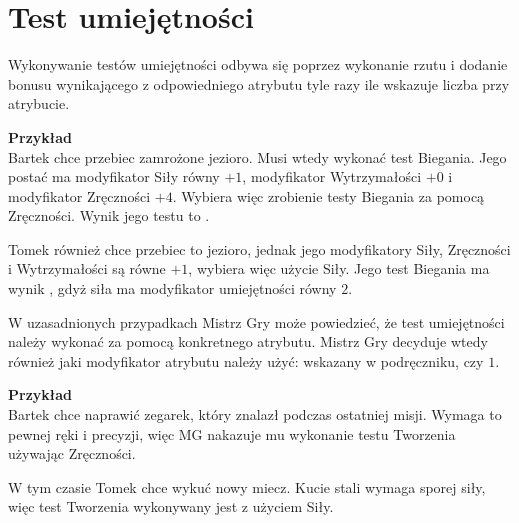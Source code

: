 \section{Test umiejętności}

Wykonywanie testów umiejętności odbywa się poprzez wykonanie rzutu  i
dodanie bonusu wynikającego z odpowiedniego atrybutu tyle razy ile wskazuje
liczba przy atrybucie.

\begin{tcolorbox}
	{\large\bfseries Przykład}\\
Bartek chce przebiec zamrożone jezioro. Musi wtedy wykonać test
Biegania. Jego postać ma modyfikator Siły równy \( +1 \), modyfikator
Wytrzymałości \( +0 \) i modyfikator Zręczności \( +4 \). Wybiera więc zrobienie
testy Biegania za pomocą Zręczności. Wynik jego testu to .

Tomek również chce przebiec to jezioro, jednak jego modyfikatory Siły,
Zręczności i Wytrzymałości są równe \( +1 \), wybiera więc użycie Siły. Jego
test Biegania ma wynik , gdyż siła ma modyfikator
umiejętności równy \( 2 \).
\end{tcolorbox}

W uzasadnionych przypadkach Mistrz Gry może powiedzieć, że test umiejętności
należy wykonać za pomocą konkretnego atrybutu. Mistrz Gry decyduje wtedy
również jaki modyfikator atrybutu należy użyć: wskazany w podręczniku, czy \( 1
\).

\begin{tcolorbox}
	{\large\bfseries Przykład}\\
	Bartek chce naprawić zegarek, który znalazł podczas ostatniej misji. Wymaga
	to pewnej ręki i precyzji, więc MG nakazuje mu wykonanie testu Tworzenia
	używając Zręczności.

	W tym czasie Tomek chce wykuć nowy miecz. Kucie stali wymaga sporej siły,
	więc test Tworzenia wykonywany jest z użyciem Siły.
\end{tcolorbox}
